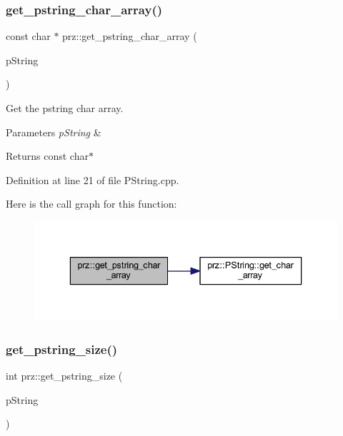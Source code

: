 \subsubsection{\texorpdfstring{get\_pstring\_char\_array()}{get\_pstring\_char\_array()}}
{\footnotesize\ttfamily const char $\ast$ prz\+::get\+\_\+pstring\+\_\+char\+\_\+array (\begin{DoxyParamCaption}\item[{\mbox{\hyperlink{classprz_1_1_p_string}{P\+String}} $\ast$}]{p\+String }\end{DoxyParamCaption})}



Get the pstring char array. 


\begin{DoxyParams}{Parameters}
{\em p\+String} & \\
\hline
\end{DoxyParams}
\begin{DoxyReturn}{Returns}
const char$\ast$ 
\end{DoxyReturn}


Definition at line 21 of file P\+String.\+cpp.

Here is the call graph for this function\+:
\nopagebreak
\begin{figure}[H]
\begin{center}
\leavevmode
\includegraphics[width=336pt]{namespaceprz_ada727f31dec00b46eaf85d040dc0641c_cgraph}
\end{center}
\end{figure}
\mbox{\label{namespaceprz_abcd7a4fe2b50f3789b630197ee8cc378}} 
\subsubsection{\texorpdfstring{get\_pstring\_size()}{get\_pstring\_size()}}
{\footnotesize\ttfamily int prz\+::get\+\_\+pstring\+\_\+size (\begin{DoxyParamCaption}\item[{\mbox{\hyperlink{classprz_1_1_p_string}{P\+String}} $\ast$}]{p\+String }\end{DoxyParamCaption})}



